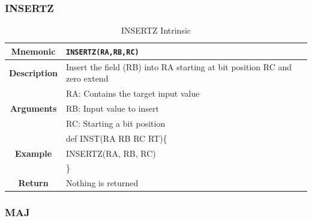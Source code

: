 \documentclass{article}
\begin{document}
\clearpage
\subsubsection{INSERTZ}
\label{sec:INSERTZ}

\begin{table}[h]
\begin{center}
\caption{INSERTZ Intrinsic}
\vspace{0.125in}
\label{tab:INSERTZIntrinsic}
\begin{tabular}{|c|l|}
\hline
\textbf{Mnemonic} & \texttt{INSERTZ(RA,RB,RC)}\\
\hline
\textbf{Description} & Insert the field (RB) into RA starting at bit position RC and zero extend\\
\hline
\multirow{3}{*}{\textbf{Arguments}} & RA: Contains the target input value\\
                          			     & RB: Input value to insert\\
			                              & RC: Starting a bit position\\
\hline
\multirow{3}{*}{\textbf{Example}} & def INST(RA RB RC RT)\{\\
                          			  &   INSERTZ(RA, RB, RC)\\
                                                    & \}\\
\hline
\textbf{Return} & Nothing is returned\\                                                    
\hline
\end{tabular}
\end{center}
\end{table}

\clearpage
\subsubsection{MAJ}
\label{sec:MAJ}
\end{document}

